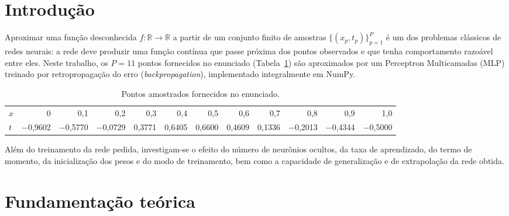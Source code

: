 \documentclass[12pt,oneside,a4paper,english,brazil]{abntex2}
\begin{document}
\frenchspacing

\imprimircapa
\imprimirfolhaderosto

\textual

\section{Introdução}
Aproximar uma função desconhecida $f:\mathbb{R}\to\mathbb{R}$ a partir de um
conjunto finito de amostras $\{(x_p,t_p)\}_{p=1}^{P}$ é um dos problemas
clássicos de redes neurais: a rede deve produzir uma função contínua que
passe próxima dos pontos observados e que tenha comportamento razoável entre
eles. Neste trabalho, os $P=11$ pontos fornecidos no enunciado
(Tabela~\ref{tab:dados}) são aproximados por um Perceptron Multicamadas (MLP)
treinado por retropropagação do erro (\textit{backpropagation}), implementado
integralmente em NumPy.

\begin{table}[H]
\centering
\caption{Pontos amostrados fornecidos no enunciado.}
\label{tab:dados}
\footnotesize\setlength{\tabcolsep}{2.5pt}
\begin{tabular}{l*{11}{r}}
\toprule
$x$ & 0 & 0,1 & 0,2 & 0,3 & 0,4 & 0,5 & 0,6 & 0,7 & 0,8 & 0,9 & 1,0\\
$t$ & $-$0,9602 & $-$0,5770 & $-$0,0729 & 0,3771 & 0,6405 & 0,6600 & 0,4609 & 0,1336 & $-$0,2013 & $-$0,4344 & $-$0,5000\\
\bottomrule
\end{tabular}
\end{table}

Além do treinamento da rede pedida, investigam-se o efeito do número de
neurônios ocultos, da taxa de aprendizado, do termo de momento, da
inicialização dos pesos e do modo de treinamento, bem como a capacidade de
generalização e de extrapolação da rede obtida.

\section{Fundamentação teórica}
\end{document}
